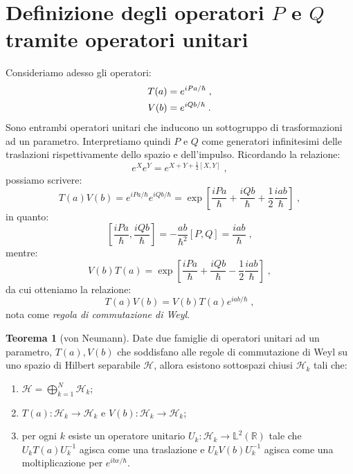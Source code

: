 \documentclass[10pt,a4paper]{report}
\theoremstyle{definition}
\newtheorem{thm}{Teorema}[section]
\newcommand{\ham}{\mathcal{H}}
\numberwithin{equation}{section}
\begin{document}
\section{Definizione degli operatori $P$ e $Q$ tramite operatori unitari}
Consideriamo adesso gli operatori:
\begin{align}
T(a)&=e^{iPa/\hbar}\;, \notag \\
V(b)&=e^{iQb/\hbar}\;.
\end{align}
Sono entrambi operatori unitari che inducono un sottogruppo di trasformazioni ad un parametro. Interpretiamo quindi $P$ e $Q$ come generatori infinitesimi delle traslazioni rispettivamente dello spazio e dell'impulso. Ricordando la relazione:
\begin{equation}
e^Xe^Y=e^{X+Y+\frac{1}{2}[X,Y]}\;,
\end{equation}
possiamo scrivere:
\begin{equation}
T(a)V(b)=e^{iPa/\hbar}e^{iQb/\hbar}=\exp\left[\frac{iPa}{\hbar}+\frac{iQb}{\hbar}+\frac{1}{2}\frac{iab}{\hbar}\right]\;,
\end{equation}
in quanto:
\begin{equation}
\left[\frac{iPa}{\hbar},\frac{iQb}{\hbar}\right]=-\frac{ab}{\hbar^2}[P,Q]=\frac{iab}{\hbar}\;,
\end{equation}
mentre:
\begin{equation}
V(b)T(a)=\exp\left[\frac{iPa}{\hbar}+\frac{iQb}{\hbar}-\frac{1}{2}\frac{iab}{\hbar}\right]\;,
\end{equation}
da cui otteniamo la relazione:
\begin{equation}
T(a)V(b)=V(b)T(a)e^{iab/\hbar}\;,
\end{equation}
nota come \textit{regola di commutazione di Weyl}.
\begin{thm}[von Neumann] Date due famiglie di operatori unitari ad un parametro, $T(a),V(b)$ che soddisfano alle regole di commutazione di Weyl su uno spazio di Hilbert separabile $\ham$, allora esistono sottospazi chiusi $\ham_k$ tali che:
\begin{enumerate}
\item $\ham=\bigoplus_{k=1}^N \ham_k$;
\item $T(a):\ham_k\to\ham_k$ e $V(b):\ham_k\to\ham_k$;
\item per ogni $k$ esiste un operatore unitario $U_k:\ham_k\to\mathbb{L}^2(\mathbb{R})$ tale che $U_kT(a)U_k^{-1}$ agisca come una traslazione e $U_kV(b)U_k^{-1}$ agisca come una moltiplicazione per $e^{ibx/\hbar}$.
\end{enumerate}
\end{thm}
\end{document}
